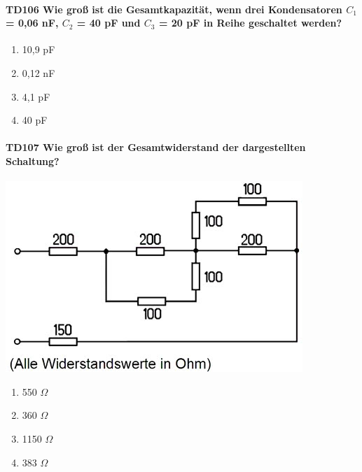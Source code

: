 \documentclass[8pt]{article}
\begin{document}
\begin{enumerate}
\begin{enumerate}[nolistsep,label=\Alph*]
\paragraph*{TD106 Wie groß ist die Gesamtkapazität, wenn drei Kondensatoren $C_{1}$ = 0,06 nF, $C_{2}$ = 40 pF und $C_{3}$ = 20 pF in Reihe geschaltet werden?}
\begin{enumerate}[nolistsep,label=\Alph*]
\item 10,9 pF
\item 0,12 nF
\item 4,1 pF
\item 40 pF
\end{enumerate}

\paragraph*{TD107 Wie groß ist der Gesamtwiderstand der dargestellten Schaltung?}
\begin{center}
	\begin{minipage}{\linewidth}
		\centering
		\includegraphics[scale=1.0]{pics/td107_a.jpg}
	\end{minipage}
\end{center}
\begin{enumerate}[nolistsep,label=\Alph*]
\item 550 $\Omega$
\item 360 $\Omega$
\item 1150 $\Omega$
\item 383 $\Omega$
\end{enumerate}


\end{enumerate}
\end{enumerate}
\end{document}
